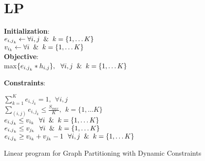 \documentclass[13pt, letterpaper]{article}
\begin{document}
\section{LP}
\begin{algorithm}[H]

\SetAlgoLined
{}
 \vspace*{.1cm}
 \vspace*{.1cm}
 \textbf{Initialization}: \\
 $e_{{i,j}_k} \leftarrow \forall i,j \And k = \{1, \dots K\} $\\
 $v_{i_{k}} \leftarrow \forall i \And k = \{1, \dots K\}$\\ 
  \vspace*{.1cm}
 \textbf{Objective}: \\
 max$\{e_{{i,j}_{k}} * h_{i,j}\}, \ \ \forall i,j \And k = \{1, \dots K\}$

  \vspace*{.1cm}
 \textbf{Constraints}:

 \vspace*{.1cm}
$\sum_{k = 1}^{K} e_{{i,j}_{k}} = 1, \ \  \forall i,j $ \\
$\sum_{(i,j)} e_{{i,j}_{k}} \leq \frac{S_{max}}{K}, \ \ k = \{1, \dots K\}$\\
$e_{{i,j}_{k}} \leq v_{i_{k}} \ \ \forall i \And k = \{1, \dots K\}$ \\ 
$e_{{i,j}_{k}} \leq v_{j_{k}} \ \ \forall i \And k = \{1, \dots K\}$\\
$e_{{i,j}_{k}} \geq v_{i_{k}} +  v_{j_{k}} -1 \ \ \forall i,j \And k = \{1, \dots K\}$
 \caption{Linear program for Graph Partitioning with Dynamic Constraints}
\end{algorithm}









\label{totalpag} 
\end{document}
